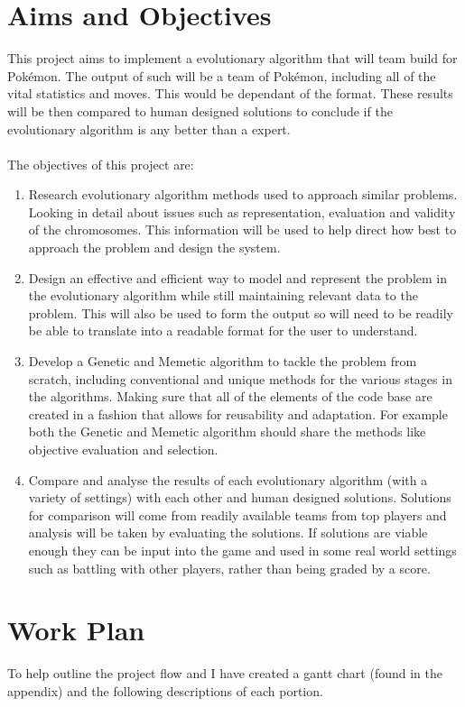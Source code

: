 \documentclass[a4paper]{article}
\newcommand{\Pokemon}{Pok\'{e}mon}
\begin{document}
\section{Aims and Objectives}
This project aims to implement a evolutionary algorithm that will team build for \Pokemon{}. The output of such will be a team of \Pokemon{}, including all of the vital statistics and moves. This would be dependant of the format. These results will be then compared to human designed solutions to conclude if the evolutionary algorithm is any better than a expert.\\
\\The objectives of this project are:
\begin{enumerate}
    \item Research evolutionary algorithm methods used to approach similar problems. Looking in detail about issues such as representation, evaluation and validity of the chromosomes. This information will be used to help direct how best to approach the problem and design the system.
    \item Design an effective and efficient way to model and represent the problem in the evolutionary algorithm while still maintaining relevant data to the problem. This will also be used to form the output so will need to be readily be able to translate into a readable format for the user to understand.
    \item Develop a Genetic and Memetic algorithm to tackle the problem from scratch, including conventional and unique methods for the various stages in the algorithms. Making sure that all of the elements of the code base are created in a fashion that allows for reusability and adaptation. For example both the Genetic and Memetic algorithm should share the methods like objective evaluation and selection.
    \item Compare and analyse the results of each evolutionary algorithm (with a variety of settings) with each other and human designed solutions. Solutions for comparison will come from readily available teams from top players and analysis will be taken by evaluating the solutions. If solutions are viable enough they can be input into the game and used in some real world settings such as battling with other players, rather than being graded by a score.
\end{enumerate}

\section{Work Plan}
To help outline the project flow and I have created a gantt chart (found in the appendix) and the following descriptions of each portion.
\end{document}
